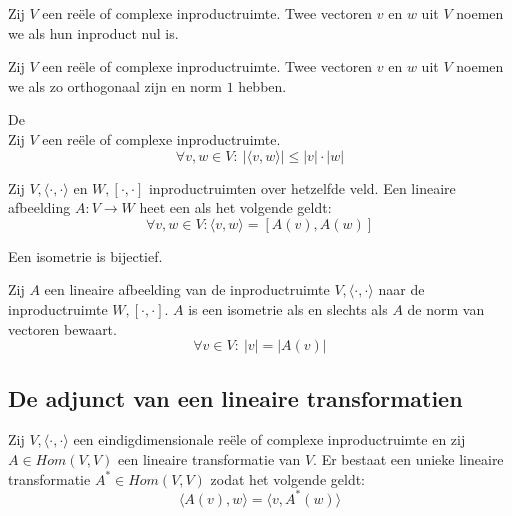 \documentclass[main.tex]{subfiles}
\begin{document}
\begin{de}
  Zij $V$ een re\"ele of complexe inproductruimte.
  Twee vectoren $v$ en $w$ uit $V$ noemen we  als hun inproduct nul is.
\end{de}

\begin{de}
  Zij $V$ een re\"ele of complexe inproductruimte.
  Twee vectoren $v$ en $w$ uit $V$ noemen we  als zo orthogonaal zijn en norm $1$ hebben.
\end{de}

\begin{st}
  De \\
  Zij $V$ een re\"ele of complexe inproductruimte.
  \[ \forall v,w \in V:\ |\langle v,w \rangle| \le |v| \cdot |w| \]
\end{st}

\begin{de}
  Zij $V,\langle\cdot,\cdot\rangle$ en $W,[\cdot,\cdot]$ inproductruimten over hetzelfde veld.
  Een lineaire afbeelding $A:V \rightarrow W$ heet een  als het volgende geldt:
  \[ \forall v,w \in V: \langle v,w \rangle = [A(v),A(w)] \]
\end{de}

\begin{ei}
  Een isometrie is bijectief.
\end{ei}

\begin{ei}
  Zij $A$ een lineaire afbeelding van de inproductruimte $V,\langle\cdot,\cdot\rangle$ naar de inproductruimte $W,[\cdot,\cdot]$.
  $A$ is een isometrie als en slechts als $A$ de norm van vectoren bewaart.
  \[ \forall v \in V:\ |v| = |A(v)| \]
\end{ei}

\subsection{De adjunct van een lineaire transformatien}
\label{sec:de-adjunct-van}

\begin{st}
  Zij $V,\langle\cdot,\cdot\rangle$ een eindigdimensionale re\"ele of complexe inproductruimte en zij $A\in Hom(V,V)$ een lineaire transformatie van $V$.
  Er bestaat een unieke lineaire transformatie $A^{*} \in Hom(V,V)$ zodat het volgende geldt:
  \[ \langle A(v),w \rangle = \langle v, A^{*}(w) \rangle \]
\end{st}
\end{document}
